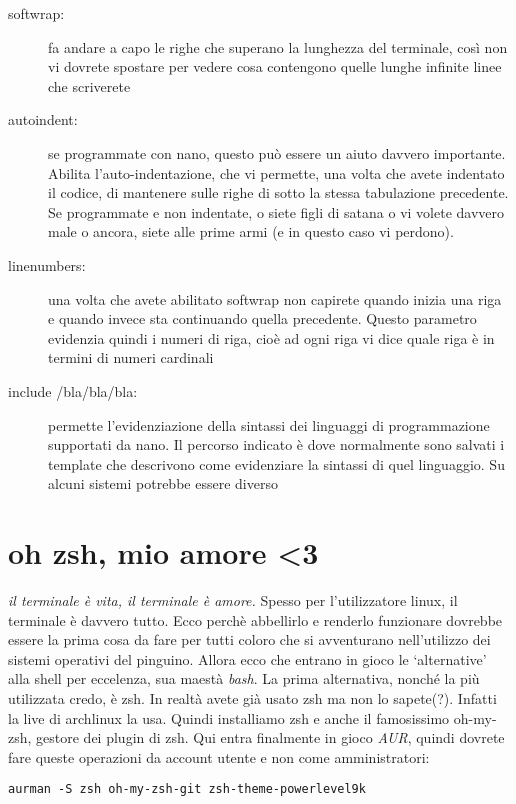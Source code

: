 \documentclass[twoside,italian]{book}
\newcommand{\centcode}[1]{
	
	\definecolor{centcode}{rgb}{0.5,0.1,0.1}
	
	\begin{center}
	 	\texttt{\textcolor{centcode}{#1}}
	\end{center}
	
	
}
\begin{document}
			\begin{description}
				
				\item[softwrap:] fa andare a capo le righe che superano la lunghezza del terminale, così non vi dovrete spostare per vedere cosa contengono quelle lunghe infinite linee che scriverete
				
				\item[autoindent:] se programmate con nano, questo può essere un aiuto davvero importante. Abilita l'auto-indentazione, che vi permette, una volta che avete indentato il codice, di mantenere sulle righe di sotto la stessa tabulazione precedente. Se programmate e non indentate, o siete figli di satana o vi volete davvero male o ancora, siete alle prime armi (e in questo caso vi perdono).
				
				\item [linenumbers:] una volta che avete abilitato softwrap non capirete quando inizia una riga e quando invece sta continuando quella precedente. Questo parametro evidenzia quindi i numeri di riga, cioè ad ogni riga vi dice quale riga è in termini di numeri cardinali
				
				\item[include /bla/bla/bla:] permette l'evidenziazione della sintassi dei linguaggi di programmazione supportati da nano. Il percorso indicato è dove normalmente sono salvati i template che descrivono come evidenziare la sintassi di quel linguaggio. Su alcuni sistemi potrebbe essere diverso
			\end{description}
		
		\section{oh zsh, mio amore <3}
			
			\textit{il terminale è vita, il terminale è amore.} Spesso per l'utilizzatore linux, il terminale è davvero tutto. Ecco perchè abbellirlo e renderlo funzionare dovrebbe essere la prima cosa da fare per tutti coloro che si avventurano nell'utilizzo dei sistemi operativi del pinguino. Allora ecco che entrano in gioco le `alternative' alla shell per eccelenza, sua maestà \textit{bash}.
			La prima alternativa, nonché la più utilizzata credo, è zsh. In realtà avete già usato zsh ma non lo sapete(?). Infatti la live di archlinux la usa.
			Quindi installiamo zsh e anche il famosissimo oh-my-zsh, gestore dei plugin di zsh.
			Qui entra finalmente in gioco \textit{AUR}, quindi dovrete fare queste operazioni da account utente e non come amministratori:
			\centcode{aurman -S zsh oh-my-zsh-git zsh-theme-powerlevel9k}
			
\end{document}
